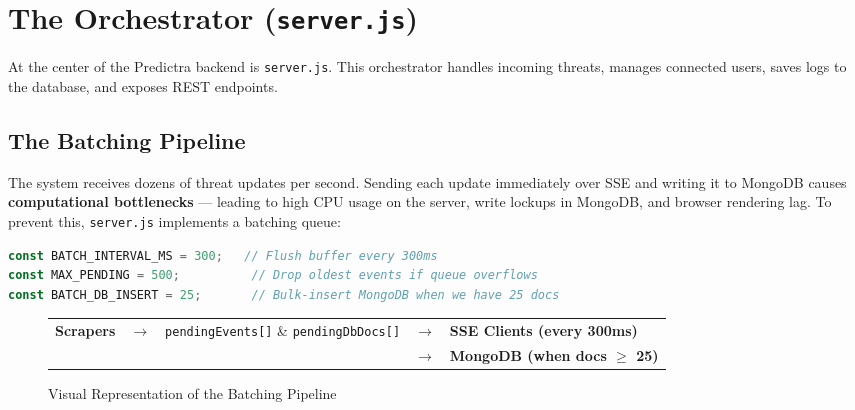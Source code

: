\documentclass[11pt,a4paper]{report}
\begin{document}
\chapter{The Orchestrator (\texttt{server.js})}

At the center of the Predictra backend is \texttt{server.js}. This orchestrator handles incoming threats, manages connected users, saves logs to the database, and exposes REST endpoints.

\section{The Batching Pipeline}
The system receives dozens of threat updates per second. Sending each update immediately over SSE and writing it to MongoDB causes \textbf{computational bottlenecks} --- leading to high CPU usage on the server, write lockups in MongoDB, and browser rendering lag. To prevent this, \texttt{server.js} implements a batching queue:
\begin{lstlisting}[language=JavaScript]
const BATCH_INTERVAL_MS = 300;   // Flush buffer every 300ms
const MAX_PENDING = 500;          // Drop oldest events if queue overflows
const BATCH_DB_INSERT = 25;       // Bulk-insert MongoDB when we have 25 docs
\end{lstlisting}

\begin{figure}[H]
  \centering
  \small
  \begin{tabular}{rcccl}
    \textbf{Scrapers} & $\rightarrow$ & \texttt{pendingEvents[]} \& \texttt{pendingDbDocs[]} & $\rightarrow$ & \textbf{SSE Clients (every 300ms)} \\
                      &               &                                                     & $\rightarrow$ & \textbf{MongoDB (when docs $\ge$ 25)}
  \end{tabular}
  \caption{Visual Representation of the Batching Pipeline}
\end{figure}
\end{document}
